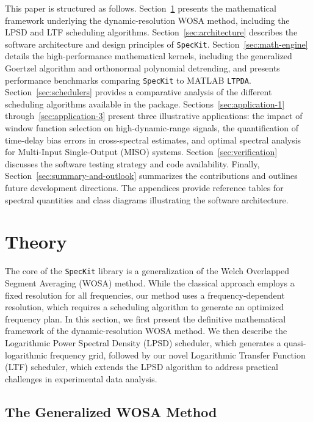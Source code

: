 \documentclass[final, 5p, times, twocolumn, number, sort&compress]{elsarticle}
\newcommand{\speckit}{\texttt{SpecKit}}
\begin{document}
This paper is structured as follows. Section~\ref{sec:theory} presents the mathematical framework underlying the dynamic-resolution WOSA method, including the LPSD and LTF scheduling algorithms. Section~\ref{sec:architecture} describes the software architecture and design principles of \speckit{}. Section~\ref{sec:math-engine} details the high-performance mathematical kernels, including the generalized Goertzel algorithm and orthonormal polynomial detrending, and presents performance benchmarks comparing \speckit{} to MATLAB \texttt{LTPDA}. Section~\ref{sec:schedulers} provides a comparative analysis of the different scheduling algorithms available in the package. Sections~\ref{sec:application-1} through~\ref{sec:application-3} present three illustrative applications: the impact of window function selection on high-dynamic-range signals, the quantification of time-delay bias errors in cross-spectral estimates, and optimal spectral analysis for Multi-Input Single-Output (MISO) systems. Section~\ref{sec:verification} discusses the software testing strategy and code availability. Finally, Section~\ref{sec:summary-and-outlook} summarizes the contributions and outlines future development directions. The appendices provide reference tables for spectral quantities and class diagrams illustrating the software architecture.    


\section{Theory}
\label{sec:theory}

The core of the \speckit{} library is a generalization of the Welch Overlapped Segment Averaging (WOSA) method. While the classical approach employs a fixed resolution for all frequencies, our method uses a frequency-dependent resolution, which requires a scheduling algorithm to generate an optimized frequency plan. In this section, we first present the definitive mathematical framework of the dynamic-resolution WOSA method. We then describe the Logarithmic Power Spectral Density (LPSD) scheduler, which generates a quasi-logarithmic frequency grid, followed by our novel Logarithmic Transfer Function (LTF) scheduler, which extends the LPSD algorithm to address practical challenges in experimental data analysis.

\subsection{The Generalized WOSA Method}
\label{sec:wosa}
\end{document}
